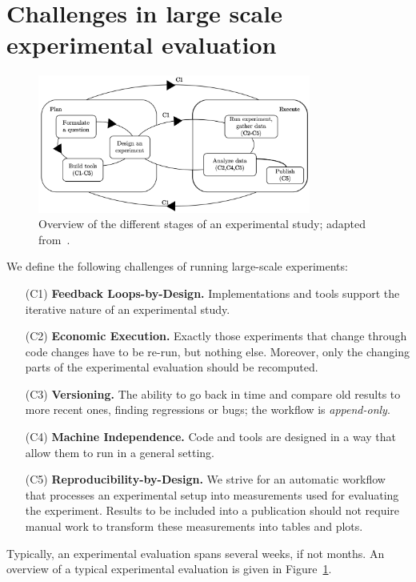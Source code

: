 \documentclass{llncs}
\begin{document}
\section{Challenges in large scale experimental evaluation}
\begin{figure}[t]
  \centering
  \includegraphics[width=0.8\textwidth]{figs/experiment_scheme.png}
  \caption{Overview of the different stages of an experimental study; adapted from~\cite{DBLP:reference/algo/McGeoch08}. %
  }
  \label{fig:overview}
\end{figure}
We define the following challenges of running large-scale experiments:
\begin{enumerate}
  \item[(C1)] \textbf{Feedback Loops-by-Design.} Implementations and tools support the iterative nature of an experimental study.
  \item[(C2)] \textbf{Economic Execution.} Exactly those experiments that change through code changes have to be re-run, but nothing else. 
  Moreover, only the changing parts of the experimental evaluation should be recomputed.
  \item[(C3)] \textbf{Versioning.} The ability to go back in time and compare old results to more recent ones, finding regressions or bugs; the workflow is \emph{append-only}.
  \item[(C4)] \textbf{Machine Independence.} Code and tools are designed in a way that allow them to run in a general setting.
  \item[(C5)] \textbf{Reproducibility-by-Design.} We strive for an automatic workflow that processes an experimental setup into measurements used for evaluating the experiment. Results to be included into a publication should not require manual work to transform these measurements into tables and plots.
\end{enumerate}
%
%
Typically, an experimental evaluation spans several weeks, if not months. An overview of a typical experimental evaluation is given in Figure~\ref{fig:overview}. 
\end{document}
